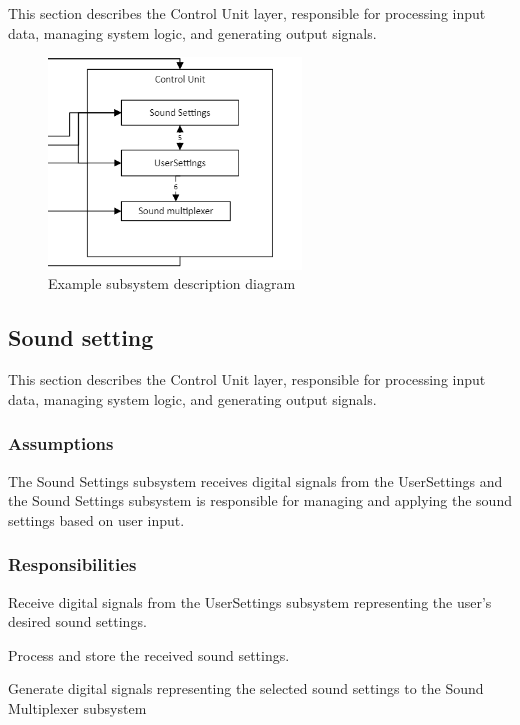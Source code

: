 This section describes the Control Unit layer, responsible for processing input data, managing system logic, and generating output signals.
\begin{figure}[h!]
	\centering
 	\includegraphics[width=0.60\textwidth]{images/ControlUnitSubsystem}
 \caption{Example subsystem description diagram}
\end{figure}
\subsection{Sound setting}
This section describes the Control Unit layer, responsible for processing input data, managing system logic, and generating output signals.


\subsubsection{Assumptions}
The Sound Settings subsystem receives digital signals from the UserSettings and the Sound Settings subsystem is responsible for managing and applying the sound settings based on user input.

\subsubsection{Responsibilities}
\begin{itemize}
\begin{item}
Receive digital signals from the UserSettings subsystem representing the user's desired sound settings.
\end{item}
\begin{item}
Process and store the received sound settings. 
\end{item}
\begin{item}
Generate digital signals representing the selected sound settings to the Sound Multiplexer subsystem 
\end{item}
\end{itemize}

